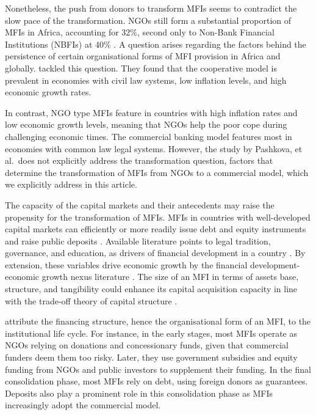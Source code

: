 \documentclass[a4paper, nobind]{templates/ociamthesis}
\begin{document}
Nonetheless, the push from donors to transform MFIs seems to contradict the slow pace of the transformation. NGOs still form a substantial proportion of MFIs in Africa, accounting for 32\%, second only to Non-Bank Financial Institutions (NBFIs) at 40\% \autocite{market2017global}. A question arises regarding the factors behind the persistence of certain organisational forms of MFI provision in Africa and globally. \textcite{pashkova2016business} tackled this question. They found that the cooperative model is prevalent in economies with civil law systems, low inflation levels, and high economic growth rates.

In contrast, NGO type MFIs feature in countries with high inflation rates and low economic growth levels, meaning that NGOs help the poor cope during challenging economic times. The commercial banking model features most in economies with common law legal systems. However, the study by Pashkova, et al.~does not explicitly address the transformation question, factors that determine the transformation of MFIs from NGOs to a commercial model, which we explicitly address in this article.

The capacity of the capital markets and their antecedents may raise the propensity for the transformation of MFIs. MFIs in countries with well-developed capital markets can efficiently or more readily issue debt and equity instruments and raise public deposits \autocite{allen2013resolving,allen2014african}. Available literature points to legal tradition, governance, and education, as drivers of financial development in a country \autocite{rajan1998financial,baltagi2009financial}. By extension, these variables drive economic growth by the financial development-economic growth nexus literature \autocite{claessens2003financial}. The size of an MFI in terms of assets base, structure, and tangibility could enhance its capital acquisition capacity in line with the trade-off theory of capital structure \autocite{barclay2005capital,gwatidzo2009corporate,ojah2016effects}.

\textcite{ledgerwood2006transforming} attribute the financing structure, hence the organisational form of an MFI, to the institutional life cycle. For instance, in the early stages, most MFIs operate as NGOs relying on donations and concessionary funds, given that commercial funders deem them too risky. Later, they use government subsidies and equity funding from NGOs and public investors to supplement their funding. In the final consolidation phase, most MFIs rely on debt, using foreign donors as guarantees. Deposits also play a prominent role in this consolidation phase as MFIs increasingly adopt the commercial model.
\end{document}
